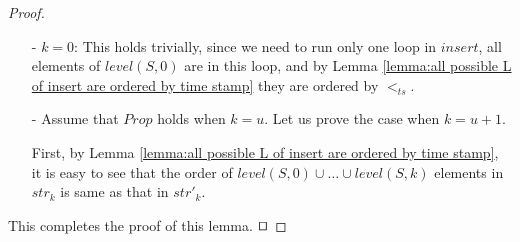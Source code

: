 {\begin {proof}
\begin{itemize}
\setlength{\itemsep}{0.5pt}
\item[-] $k=0$: This holds trivially, since we need to run only one loop in $\mathit{insert}$, all elements of $\mathit{level}(S,0)$ are in this loop, and by Lemma \ref{lemma:all possible L of insert are ordered by time stamp} they are ordered by $<_{\mathit{ts}}$.

\item[-] Assume that $\textit{Prop}$ holds when $k=u$. Let us prove the case when $k = u+1$.

First, by Lemma \ref{lemma:all possible L of insert are ordered by time stamp}, it is easy to see that the order of $\mathit{level}(S,0) \cup \ldots \cup \mathit{level}(S,k)$ elements in $\textit{str}_k$ is same as that in $\textit{str}'_k$.
\end{itemize}

This completes the proof of this lemma. $\qed$
\end {proof}
}


